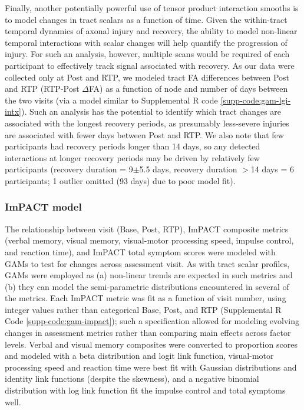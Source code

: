 \documentclass[]{imag-ms-template}
\begin{document}
Finally, another potentially powerful use of tensor product interaction smooths is to model changes in tract scalars as a function of time. Given the within-tract temporal dynamics of axonal injury and recovery, the ability to model non-linear temporal interactions with scalar changes will help quantify the progression of injury. For such an analysis, however, multiple scans would be required of each participant to effectively track signal associated with recovery. As our data were collected only at Post and RTP, we modeled tract FA differences between Post and RTP (RTP-Post $\Delta$FA) as a function of node and number of days between the two visits (via a model similar to Supplemental R code \ref{supp-code:gam-lgi-intx}). Such an analysis has the potential to identify which tract changes are associated with the longest recovery periods, as presumably less-severe injuries are associated with fewer days between Post and RTP. We also note that few participants had recovery periods longer than 14 days, so any detected interactions at longer recovery periods may be driven by relatively few participants (recovery duration = 9$\pm$5.5 days, recovery duration $>$14 days = 6 participants; 1 outlier omitted (93 days) due to poor model fit).

\subsubsection{ImPACT model}
\label{sssec:meth-gam-impact}
The relationship between visit (Base, Post, RTP), ImPACT composite metrics (verbal memory, visual memory, visual-motor processing speed, impulse control, and reaction time), and ImPACT total symptom scores were modeled with GAMs to test for changes across assessment visit. As with tract scalar profiles, GAMs were employed as (a) non-linear trends are expected in such metrics and (b) they can model the semi-parametric distributions encountered in several of the metrics. Each ImPACT metric was fit as a function of visit number, using integer values rather than categorical Base, Post, and RTP (Supplemental R Code \ref{supp-code:gam-impact}); such a specification allowed for modeling evolving changes in assessment metrics rather than comparing main effects across factor levels. Verbal and visual memory composites were converted to proportion scores and modeled with a beta distribution and logit link function, visual-motor processing speed and reaction time were best fit with Gaussian distributions and identity link functions (despite the skewness), and a negative binomial distribution with log link function fit the impulse control and total symptoms well.
\end{document}
